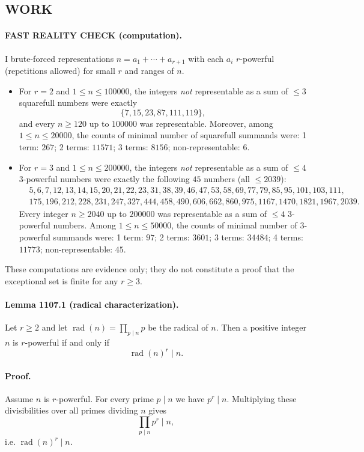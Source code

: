 \subsection*{WORK}
\paragraph{FAST REALITY CHECK (computation).}
I brute-forced representations $n=a_1+\cdots+a_{r+1}$ with each $a_i$ $r$-powerful (repetitions allowed) for small $r$ and ranges of $n$.

\begin{itemize}
\item For $r=2$ and $1\le n\le 100000$, the integers \emph{not} representable as a sum of $\le 3$ squarefull numbers were exactly
\[\{7,15,23,87,111,119\},\]
and every $n\ge 120$ up to $100000$ was representable.
Moreover, among $1\le n\le 20000$, the counts of minimal number of squarefull summands were:
1 term: $267$; 2 terms: $11571$; 3 terms: $8156$; non-representable: $6$.

\item For $r=3$ and $1\le n\le 200000$, the integers \emph{not} representable as a sum of $\le 4$ $3$-powerful numbers were exactly the following $45$ numbers (all $\le 2039$):
\[\begin{aligned}
&5,6,7,12,13,14,15,20,21,22,23,31,38,39,46,47,53,58,69,77,79,85,95,101,103,111,\\
&175,196,212,228,231,247,327,444,458,490,606,662,860,975,1167,1470,1821,1967,2039.
\end{aligned}\]
Every integer $n\ge 2040$ up to $200000$ was representable as a sum of $\le 4$ $3$-powerful numbers.
Among $1\le n\le 50000$, the counts of minimal number of $3$-powerful summands were:
1 term: $97$; 2 terms: $3601$; 3 terms: $34484$; 4 terms: $11773$; non-representable: $45$.
\end{itemize}

These computations are evidence only; they do not constitute a proof that the exceptional set is finite for any $r\ge 3$.

\paragraph{Lemma 1107.1 (radical characterization).}
Let $r\ge 2$ and let $\operatorname{rad}(n)=\prod_{p\mid n} p$ be the radical of $n$. Then a positive integer $n$ is $r$-powerful if and only if
\[\operatorname{rad}(n)^r\mid n.\]

\paragraph{Proof.}
Assume $n$ is $r$-powerful. For every prime $p\mid n$ we have $p^r\mid n$. Multiplying these divisibilities over all primes dividing $n$ gives
\[\prod_{p\mid n} p^r\mid n,\]
i.e. $\operatorname{rad}(n)^r\mid n$.

